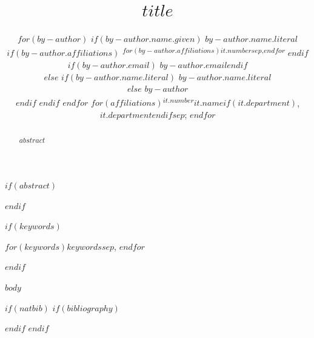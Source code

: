 \documentclass[twoside,11pt]{article}
\title{$title$}
\author{%
$for(by-author)$
  $if(by-author.name.given)$
    \name $by-author.name.literal$%
    $if(by-author.affiliations)$
      \textsuperscript{$for(by-author.affiliations)$$it.number$$sep$,$endfor$}%
    $endif$
    $if(by-author.email)$ \email $by-author.email$$endif$ \\
  $else$
    $if(by-author.name.literal)$
      $by-author.name.literal$ \\
    $else$
      $by-author$ \\
    $endif$
  $endif$
$endfor$
\AND
\addr $for(affiliations)$\textsuperscript{$it.number$}$it.name$$if(it.department)$, $it.department$$endif$$sep$; $endfor$
}
\begin{document}
\maketitle

$if(abstract)$
\begin{abstract}
$abstract$
\end{abstract}
$endif$

$if(keywords)$
\begin{keywords}
$for(keywords)$$keywords$$sep$, $endfor$
\end{keywords}
$endif$

$body$

$if(natbib)$
$if(bibliography)$

$endif$
$endif$
\end{document}
